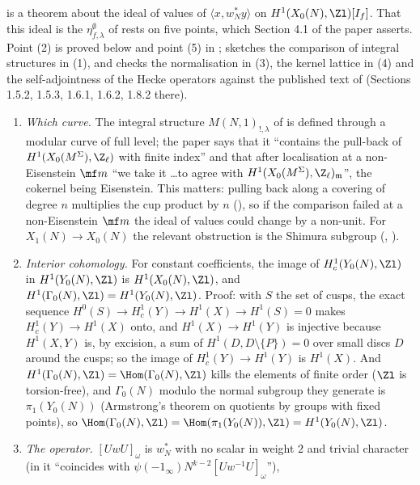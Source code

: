 \begin{remark}\label{rem:moddeg:dfg-normalisation}
 is a theorem about the ideal of values of $\langle x,w_N^*y\rangle$ on $H^1(X_0(N),\Zl)[I_f]$. That this ideal is the $\eta^\emptyset_{f,\lambda}$ of \cite{DFG04} rests on five
points, which Section 4.1 of the paper asserts. Point (2) is proved below and point (5) in ;  sketches the comparison of integral
structures in (1), and checks the normalisation in (3), the kernel lattice in (4) and the self-adjointness of the Hecke operators against the published text of \cite{DFG04}
(Sections 1.5.2, 1.5.3, 1.6.1, 1.6.2, 1.8.2 there).
\begin{enumerate}[label=(\arabic*)]
\item \emph{Which curve.} The integral structure $M(N,1)_{!,\lambda}$ of \cite{DFG04} is defined through a modular curve of full level; the paper says that it ``contains the pull-back of
$H^1(X_0(M^\Sigma),\Z_\ell)$ with finite index'' and that after localisation at a non-Eisenstein $\mf m$ ``we take it \dots to agree with $H^1(X_0(M^\Sigma),\Z_\ell)_{\mathfrak m}$'', the cokernel being
Eisenstein. This matters: pulling back along a covering of degree $n$ multiplies the cup product by $n$ (), so if the comparison failed at a non-Eisenstein $\mf m$ the
ideal of values could change by a non-unit. For $X_1(N)\to X_0(N)$ the relevant obstruction is the Shimura subgroup (, ).
\item \emph{Interior cohomology.} For constant coefficients, the image of $H^1_c(Y_0(N),\Zl)$ in $H^1(Y_0(N),\Zl)$ is $H^1(X_0(N),\Zl)$, and $H^1(\Gamma_0(N),\Zl)=H^1(Y_0(N),\Zl)$. Proof: with $S$ the set
of cusps, the exact sequence $H^0(S)\to H^1_c(Y)\to H^1(X)\to H^1(S)=0$ makes $H^1_c(Y)\to H^1(X)$ onto, and $H^1(X)\to H^1(Y)$ is injective because $H^1(X,Y)$ is, by excision, a sum of
$H^1(D,D\setminus\{P\})=0$ over small discs $D$ around the cusps; so the image of $H^1_c(Y)\to H^1(Y)$ is $H^1(X)$. And $H^1(\Gamma_0(N),\Zl)=\Hom(\Gamma_0(N),\Zl)$ kills the elements of finite order
($\Zl$ is torsion-free), and $\Gamma_0(N)$ modulo the normal subgroup they generate is $\pi_1(Y_0(N))$ (Armstrong's theorem on quotients by groups with fixed points), so
$\Hom(\Gamma_0(N),\Zl)=\Hom(\pi_1(Y_0(N)),\Zl)=H^1(Y_0(N),\Zl)$.
\item \emph{The operator.} $[UwU]_\omega$ is $w_N^*$ with no scalar in weight $2$ and trivial character (in \cite[Section 1.5.3]{DFG04} it ``coincides with $\psi(-1_\infty)N^{k-2}[Uw^{-1}U]_\omega$''),

\end{enumerate}
\end{remark}

